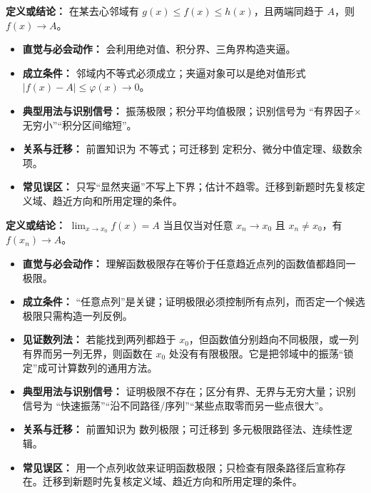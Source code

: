 \begin{knowledgeBox}
\textbf{定义或结论：} 在某去心邻域有 $g(x)\le f(x)\le h(x)$，且两端同趋于 $A$，则 $f(x)\to A$。

\begin{itemize}
  \item \textbf{直觉与必会动作：} 会利用绝对值、积分界、三角界构造夹逼。
  \item \textbf{成立条件：} 邻域内不等式必须成立；夹逼对象可以是绝对值形式 $|f(x)-A|\le\varphi(x)\to0$。
  \item \textbf{典型用法与识别信号：} 振荡极限；积分平均值极限；识别信号为 “有界因子×无穷小”“积分区间缩短”。
  \item \textbf{关系与迁移：} 前置知识为 不等式；可迁移到 定积分、微分中值定理、级数余项。
  \item \textbf{常见误区：} 只写“显然夹逼”不写上下界；估计不趋零。迁移到新题时先复核定义域、趋近方向和所用定理的条件。
\end{itemize}
\end{knowledgeBox}

\begin{knowledgeBox}
\textbf{定义或结论：} $\lim_{x\to x_0}f(x)=A$ 当且仅当对任意 $x_n\to x_0$ 且 $x_n\ne x_0$，有 $f(x_n)\to A$。

\begin{itemize}
  \item \textbf{直觉与必会动作：} 理解函数极限存在等价于任意趋近点列的函数值都趋同一极限。
  \item \textbf{成立条件：} “任意点列”是关键；证明极限必须控制所有点列，而否定一个候选极限只需构造一列反例。
  \item \textbf{见证数列法：} 若能找到两列都趋于 \(x_0\)，但函数值分别趋向不同极限，或一列有界而另一列无界，则函数在 \(x_0\) 处没有有限极限。它是把邻域中的振荡“锁定”成可计算数列的通用方法。
  \item \textbf{典型用法与识别信号：} 证明极限不存在；区分有界、无界与无穷大量；识别信号为 “快速振荡”“沿不同路径/序列”“某些点取零而另一些点很大”。
  \item \textbf{关系与迁移：} 前置知识为 数列极限；可迁移到 多元极限路径法、连续性逻辑。
  \item \textbf{常见误区：} 用一个点列收敛来证明函数极限；只检查有限条路径后宣称存在。迁移到新题时先复核定义域、趋近方向和所用定理的条件。
\end{itemize}
\end{knowledgeBox}

